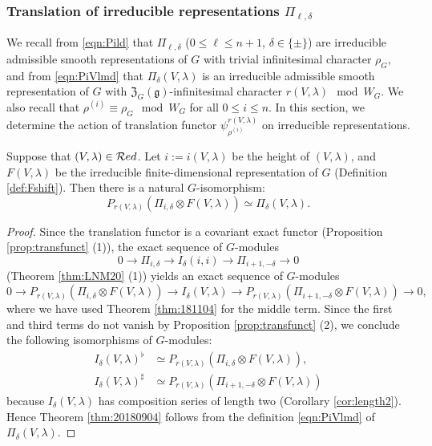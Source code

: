 \subsubsection{Translation of irreducible representations
 $\Pi_{\ell,\delta}$}

We recall from \eqref{eqn:Pild}
 that $\Pi_{\ell,\delta}$ ($0 \le \ell \le n+1$, $\delta \in \{\pm\}$)
 are irreducible admissible smooth representations
 of $G$
 with trivial infinitesimal character $\rho_G$,
 and from \eqref{eqn:PiVlmd}
 that $\Pi_{\delta}(V,\lambda)$ is an irreducible admissible smooth representation of $G$
 with ${\mathfrak{Z}}_G({\mathfrak{g}})$-infinitesimal character
 $r(V,\lambda) \mod W_G$.  
We also recall that $\rho^{(i)} \equiv \rho_G \mod W_G$
for all $0 \le i \le n$.  
In this section,
 we determine the action 
 of translation functor 
 $\psi_{\rho^{(i)}}^{r(V,\lambda)}$ 
 on irreducible representations.  

\begin{theorem}
\label{thm:20180904}
Suppose that $(V,\lambda) \in {\mathcal{R}}ed$.  
Let $i:=i(V,\lambda)$ be the height of $(V,\lambda)$, 
 and $F(V,\lambda)$ be the irreducible finite-dimensional representation
 of $G$
 (Definition \ref{def:Fshift}).  
Then there is a natural $G$-isomorphism:
\[
  P_{r(V,\lambda)} (\Pi_{i,\delta} \otimes F(V,\lambda))
  \simeq
  \Pi_{\delta}(V,\lambda).  
\]
\end{theorem}

\begin{proof}
Since the translation functor is a covariant exact functor
 (Proposition \ref{prop:transfunct} (1)), 
 the exact sequence of $G$-modules
\[
  0 \to \Pi_{i,\delta}\to I_{\delta}(i,i) \to \Pi_{i+1,-\delta} \to 0
\]
(Theorem \ref{thm:LNM20} (1)) yields 
 an exact sequence of $G$-modules
\[
  0 \to P_{r(V,\lambda)}(\Pi_{i,\delta} \otimes F(V,\lambda))
    \to I_{\delta}(V,\lambda)
    \to P_{r(V,\lambda)}(\Pi_{i+1,-\delta}\otimes F(V,\lambda))
    \to 0, 
\]
 where we have used Theorem \ref{thm:181104}
 for the middle term.  
Since the first and third terms do not vanish 
 by Proposition \ref{prop:transfunct} (2), 
 we conclude the following isomorphisms of $G$-modules:
\begin{align*}
I_{\delta}(V,\lambda)^{\flat}
&\simeq P_{r(V,\lambda)}(\Pi_{i,\delta} \otimes F(V,\lambda)), 
\\
I_{\delta}(V,\lambda)^{\sharp}
&\simeq P_{r(V,\lambda)}(\Pi_{i+1,-\delta} \otimes F(V,\lambda))
\end{align*}
because $I_{\delta}(V,\lambda)$ has composition series
 of length two
 (Corollary \ref{cor:length2}).  
Hence Theorem \ref{thm:20180904} follows from the definition 
 \eqref{eqn:PiVlmd} of $\Pi_{\delta}(V,\lambda)$.  
\end{proof}

